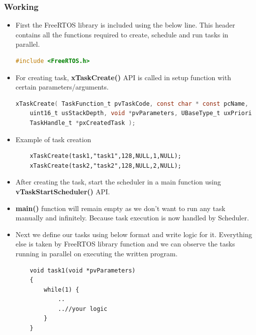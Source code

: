 \subsubsection{Working}
\begin{itemize}
    \item First the FreeRTOS library is included using the below line. This header contains all the functions required to create, schedule and run tasks in parallel.
    \begin{lstlisting}[language=C]
    #include <FreeRTOS.h>
    \end{lstlisting}
    \item For creating task, \textbf{xTaskCreate()} API is called in setup function with certain parameters/arguments.
    \begin{lstlisting}[language=C]
    xTaskCreate( TaskFunction_t pvTaskCode, const char * const pcName,
    uint16_t usStackDepth, void *pvParameters, UBaseType_t uxPriority,
    TaskHandle_t *pxCreatedTask );
    \end{lstlisting}
    \item Example of task creation
    \begin{lstlisting}
    xTaskCreate(task1,"task1",128,NULL,1,NULL);
    xTaskCreate(task2,"task2",128,NULL,2,NULL);  
    \end{lstlisting}
    \item After creating the task, start the scheduler in a main function using \textbf{vTaskStartScheduler()} API.
    \item \textbf{main()} function will remain empty as we don’t want to run any task manually and infinitely. Because task execution is now handled by Scheduler.
    \item Next we define our tasks using below format and write logic for it. Everything else is taken by FreeRTOS library function and we can observe the tasks running in parallel on executing the written program.
    \begin{lstlisting}
    void task1(void *pvParameters)  
    {
        while(1) {
            ..
            ..//your logic
        }
    }
    \end{lstlisting}
\end{itemize}
\newpage





